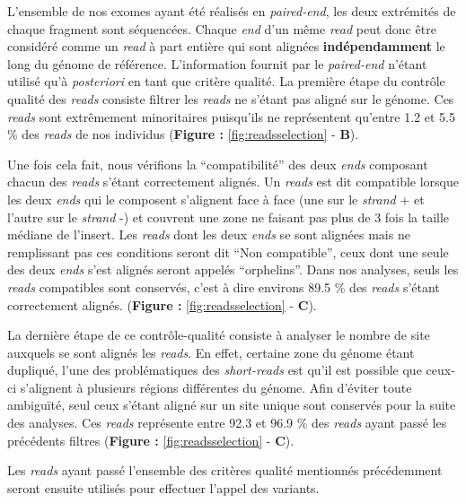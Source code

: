 \documentclass[12pt,twoside]{reedthesis}
\theoremstyle{definition}
\theoremstyle{definition}
\theoremstyle{remark}
\begin{document}
  L'ensemble de nos exomes ayant été réalisés en \emph{paired-end}, les
  deux extrémités de chaque fragment sont séquencées. Chaque \emph{end}
  d'un même \emph{read} peut donc être considéré comme un \emph{read} à
  part entière qui sont alignées \textbf{indépendamment} le long du génome
  de référence. L'information fournit par le \emph{paired-end} n'étant
  utilisé qu'à \emph{posteriori} en tant que critère qualité. La première
  étape du contrôle qualité des \emph{reads} consiste filtrer les
  \emph{reads} ne s'étant pas aligné sur le génome. Ces \emph{reads} sont
  extrêmement minoritaires puisqu'ils ne représentent qu'entre 1.2 et 5.5
  \% des \emph{reads} de nos individus (\textbf{Figure :
  }\ref{fig:readsselection} - \textbf{B}).
  
  Une fois cela fait, nous vérifions la ``compatibilité'' des deux
  \emph{ends} composant chacun des \emph{reads} s'étant correctement
  alignés. Un \emph{reads} est dit compatible lorsque les deux \emph{ends}
  qui le composent s'alignent face à face (une sur le \emph{strand} + et
  l'autre sur le \emph{strand} -) et couvrent une zone ne faisant pas plus
  de 3 fois la taille médiane de l'insert. Les \emph{reads} dont les deux
  \emph{ends} se sont alignées mais ne remplissant pas ces conditions
  seront dit ``Non compatible'', ceux dont une seule des deux \emph{ends}
  s'est alignés seront appelés ``orphelins''. Dans nos analyses, seuls les
  \emph{reads} compatibles sont conservés, c'est à dire environs 89.5 \%
  des \emph{reads} s'étant correctement alignés. (\textbf{Figure :
  }\ref{fig:readsselection} - \textbf{C}).
  
  La dernière étape de ce contrôle-qualité consiste à analyser le nombre
  de site auxquels se sont alignés les \emph{reads}. En effet, certaine
  zone du génome étant dupliqué, l'une des problématiques des
  \emph{short-reads} est qu'il est possible que ceux-ci s'alignent à
  plusieurs régions différentes du génome. Afin d'éviter toute ambiguïté,
  seul ceux s'étant aligné sur un site unique sont conservés pour la suite
  des analyses. Ces \emph{reads} représente entre 92.3 et 96.9 \% des
  \emph{reads} ayant passé les précédents filtres (\textbf{Figure :
  }\ref{fig:readsselection} - \textbf{C}).
  
  Les \emph{reads} ayant passé l'ensemble des critères qualité mentionnés
  précédemment seront ensuite utilisés pour effectuer l'appel des
  variants.
  
  \newpage
  
\end{document}
